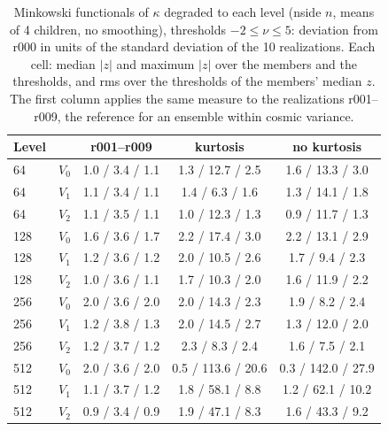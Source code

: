 \begin{table}
\caption{Minkowski functionals of $\kappa$ degraded to each level (nside $n$, means of 4 children, no smoothing), thresholds $-2\leq\nu\leq5$: deviation from r000 in units of the standard deviation of the 10 realizations. Each cell: median $|z|$ and maximum $|z|$ over the members and the thresholds, and rms over the thresholds of the members' median $z$. The first column applies the same measure to the realizations r001--r009, the reference for an ensemble within cosmic variance.}
\label{tab:mf_levels_n512}
\centering\small
\begin{tabular}{llccc}
\hline\hline
Level &  & r001--r009 & kurtosis & no kurtosis \\
\hline
64 & $V_0$ & 1.0 / 3.4 / 1.1 & 1.3 / 12.7 / 2.5 & 1.6 / 13.3 / 3.0 \\
64 & $V_1$ & 1.1 / 3.4 / 1.1 & 1.4 / 6.3 / 1.6 & 1.3 / 14.1 / 1.8 \\
64 & $V_2$ & 1.1 / 3.5 / 1.1 & 1.0 / 12.3 / 1.3 & 0.9 / 11.7 / 1.3 \\
128 & $V_0$ & 1.6 / 3.6 / 1.7 & 2.2 / 17.4 / 3.0 & 2.2 / 13.1 / 2.9 \\
128 & $V_1$ & 1.2 / 3.6 / 1.2 & 2.0 / 10.5 / 2.6 & 1.7 / 9.4 / 2.3 \\
128 & $V_2$ & 1.0 / 3.6 / 1.1 & 1.7 / 10.3 / 2.0 & 1.6 / 11.9 / 2.2 \\
256 & $V_0$ & 2.0 / 3.6 / 2.0 & 2.0 / 14.3 / 2.3 & 1.9 / 8.2 / 2.4 \\
256 & $V_1$ & 1.2 / 3.8 / 1.3 & 2.0 / 14.5 / 2.7 & 1.3 / 12.0 / 2.0 \\
256 & $V_2$ & 1.2 / 3.7 / 1.2 & 2.3 / 8.3 / 2.4 & 1.6 / 7.5 / 2.1 \\
512 & $V_0$ & 2.0 / 3.6 / 2.0 & 0.5 / 113.6 / 20.6 & 0.3 / 142.0 / 27.9 \\
512 & $V_1$ & 1.1 / 3.7 / 1.2 & 1.8 / 58.1 / 8.8 & 1.2 / 62.1 / 10.2 \\
512 & $V_2$ & 0.9 / 3.4 / 0.9 & 1.9 / 47.1 / 8.3 & 1.6 / 43.3 / 9.2 \\
\hline
\end{tabular}
\end{table}
